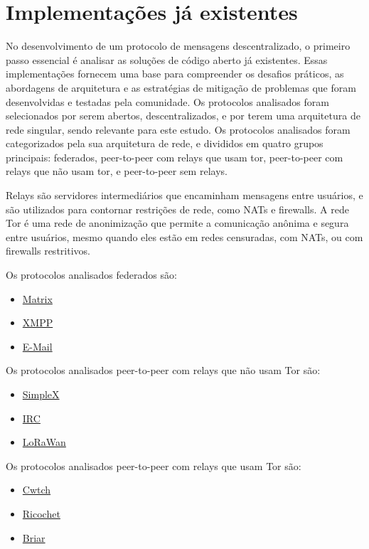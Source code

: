 
\chapter{Implementações já existentes}

No desenvolvimento de um protocolo de mensagens descentralizado, o primeiro passo essencial é analisar as soluções de código aberto já existentes. Essas implementações fornecem uma base para compreender os desafios práticos, as abordagens de arquitetura e as estratégias de mitigação de problemas que foram desenvolvidas e testadas pela comunidade. Os protocolos analisados foram selecionados por serem abertos, descentralizados, e por terem uma arquitetura de rede singular, sendo relevante para este estudo. Os protocolos analisados foram categorizados pela sua arquitetura de rede, e divididos em quatro grupos principais: federados, peer-to-peer com relays que usam tor, peer-to-peer com relays que não usam tor, e peer-to-peer sem relays. 

Relays são servidores intermediários que encaminham mensagens entre usuários, e são utilizados para contornar restrições de rede, como NATs e firewalls. A rede Tor é uma rede de anonimização que permite a comunicação anônima e segura entre usuários, mesmo quando eles estão em redes censuradas, com NATs, ou com firewalls restritivos.

Os protocolos analisados federados são:
\begin{itemize}
  \item \href{https://matrix.org/}{Matrix}
  \item \href{https://xmpp.org/}{XMPP}
  \item \href{https://en.wikipedia.org/wiki/Email}{E-Mail}
\end{itemize}

Os protocolos analisados peer-to-peer com relays que não usam Tor são:
\begin{itemize}
  \item \href{https://simplex.chat/}{SimpleX}
  \item \href{https://www.irc.org/}{IRC}
  \item \href{https://lora-alliance.org/}{LoRaWan}
\end{itemize}

Os protocolos analisados peer-to-peer com relays que usam Tor são:
\begin{itemize}
  \item \href{https://cwtch.im/}{Cwtch}
  \item \href{https://ricochet.im/}{Ricochet}
  \item \href{https://briarproject.org/}{Briar}
\end{itemize}

